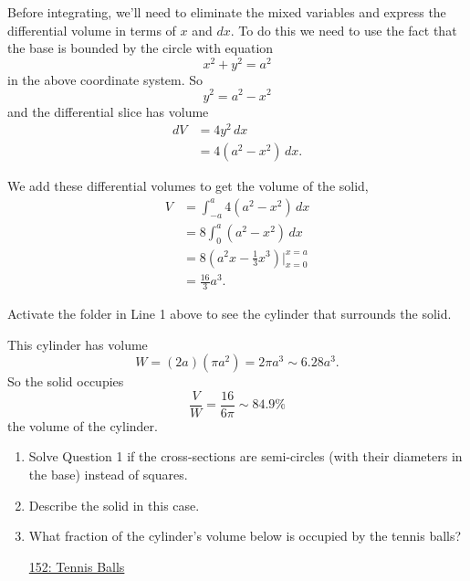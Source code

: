 \documentclass{ximera}
\begin{document}
\begin{question}
\begin{explanation}
Before integrating, we'll need to eliminate the mixed variables and express the differential volume in terms of $x$ and $dx$. To do this we need to use the fact that the base is bounded by the circle with equation
\[
      x^2 + y^2 = a^2
\]
in the above coordinate system. So
\[
      y^2 = a^2 - x^2
\]
and the differential slice has volume
\begin{align*}
  dV & = 4y^2 \, dx \\
       &= 4(a^2-x^2)\, dx .
\end{align*}

We add these differential volumes to get the volume of the solid,
\begin{align*}
   V &= \int_{-a}^a 4(a^2-x^2)\, dx \\
      &= 8 \int_0^a (a^2-x^2)\, dx \\
      &= 8 \left( a^2x - \frac{1}{3}x^3 \right) \Big|_{x=0}^{x=a} \\
      &= \frac{16}{3}a^3 .
\end{align*}


\item Activate the folder in Line 1 above to see the cylinder that surrounds the solid. 

This cylinder has volume
\[
 W = (2  a) (\pi a^2) = 2\pi a^3  \sim 6.28 a^3.
\]
So the solid occupies
\[
  \frac{V}{W} = \frac{16}{6\pi} \sim 84.9\%
\]
the volume of the cylinder.
\end{explanation}
\end{question}

\begin{question} \label{QLdfer3r}
\begin{enumerate}
\item Solve Question 1 if the cross-sections are semi-circles (with their diameters in the base) instead of squares.

\item Describe the solid in this case. 

\item What fraction of the cylinder's volume below is occupied by the tennis balls?

\begin{onlineOnly}
    \begin{center}
\end{center}
\end{onlineOnly}

\href{https://www.desmos.com/calculator/5ip866uqox}{152: Tennis Balls}

\end{enumerate}
\end{question}
\end{document}
